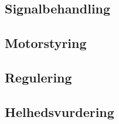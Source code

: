 \subsection{Signalbehandling}

\subsection{Motorstyring}

\subsection{Regulering}

\subsection{Helhedsvurdering}

